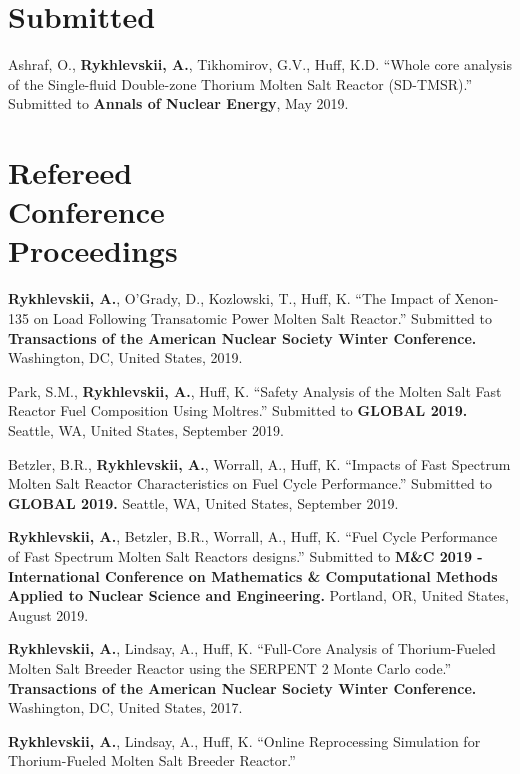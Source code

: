 \documentclass[margin,line]{resume}
\begin{document}
\begin{resume}
	\section{\mysidestyle Submitted}
	\begin{bibenum}
		\item Ashraf, O., \textbf{Rykhlevskii, A.}, Tikhomirov, G.V., Huff, 
		K.D. ``Whole core analysis of the Single-fluid Double-zone Thorium 
		Molten Salt Reactor (SD-TMSR).'' Submitted to \textbf{Annals of 
		Nuclear Energy}, May 2019.
	\end{bibenum}
    \section{\mysidestyle Refereed\\Conference\\Proceedings}
    \begin{bibenum}
     \item \textbf{Rykhlevskii, A.}, O'Grady, D., Kozlowski, T., Huff, K. 
     ``The Impact of Xenon-135 on Load Following Transatomic Power Molten Salt 
     Reactor.'' Submitted to 
		 \textbf{Transactions of the American Nuclear Society Winter 
		 Conference.} Washington, DC, United States, 2019.
     \item Park, S.M., \textbf{Rykhlevskii, A.}, Huff, K. 
	``Safety Analysis of the Molten Salt Fast Reactor Fuel Composition Using 
	Moltres.'' Submitted to \textbf{GLOBAL 2019.} Seattle, WA, United 
	States,	September 2019.    
     \item Betzler, B.R., \textbf{Rykhlevskii, A.}, Worrall, A., Huff, K. 
     ``Impacts of Fast Spectrum Molten Salt Reactor Characteristics on Fuel 
     Cycle Performance.'' Submitted to \textbf{GLOBAL 2019.} Seattle, WA, 
     United States, September 2019.    
    \item \textbf{Rykhlevskii, A.}, Betzler, B.R., Worrall, A., Huff, K. ``Fuel Cycle Performance of Fast Spectrum Molten Salt Reactors designs.'' Submitted to \textbf{M\&C 2019 - International Conference on Mathematics \& Computational Methods Applied to Nuclear Science and Engineering.} 
            Portland, OR, United States, August 2019.    
    \item \textbf{Rykhlevskii, A.}, Lindsay, A., Huff, K. ``Full-Core Analysis of Thorium-Fueled Molten Salt Breeder Reactor using the SERPENT 2 Monte Carlo code.'' 
            \textbf{Transactions of the American Nuclear Society Winter Conference.} 
            Washington, DC, United States, 2017.
    \item \textbf{Rykhlevskii, A.}, Lindsay, A., Huff, K. ``Online Reprocessing Simulation for Thorium-Fueled Molten Salt Breeder Reactor.'' 

\end{bibenum}
\end{resume}
\end{document}
